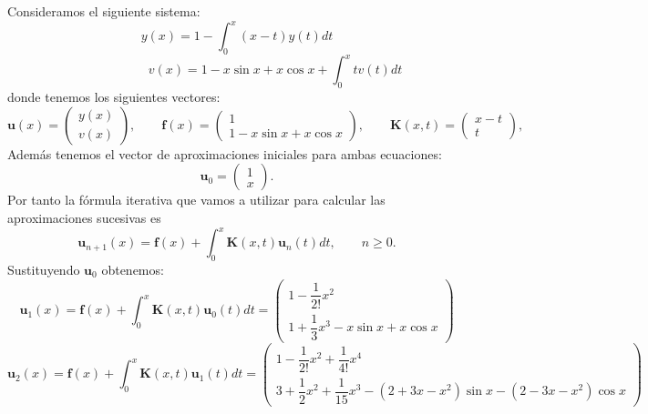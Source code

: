 \begin{ejemplo}
	Consideramos el siguiente sistema:
	\begin{equation}
		y(x) = 1 - \int_0^x (x-t)y(t)dt
	\end{equation}
	\begin{equation}
		\qquad \qquad \qquad v(x) = 1 - x \sin x + x \cos x + \int_0^x tv(t)dt
	\end{equation}
	donde tenemos los siguientes vectores:
	\begin{equation}
		\textbf{u}(x) = \begin{pmatrix}	y(x) \\ v(x)	\end{pmatrix}, \qquad \textbf{f}(x) = \begin{pmatrix}	1 \\ 1 - x \sin x + x \cos x	\end{pmatrix}, \qquad \textbf{K}(x,t) = \begin{pmatrix}	x-t \\ t	\end{pmatrix},
	\end{equation}
	Además tenemos el vector de aproximaciones iniciales para ambas ecuaciones:
	\begin{equation}
		\textbf{u}_0 = \begin{pmatrix}	1 \\ x	\end{pmatrix}.
	\end{equation}
	Por tanto la fórmula iterativa que vamos a utilizar para calcular las aproximaciones sucesivas es
	\begin{equation}
		\textbf{u}_{n+1}(x) = \textbf{f}(x) + \int_0^x \textbf{K}(x,t)\textbf{u}_n(t)dt, \qquad n \geqslant 0.
	\end{equation}
	Sustituyendo $\textbf{u}_0$ obtenemos:
	\begin{equation}
		\textbf{u}_{1}(x) = \textbf{f}(x) + \int_0^x \textbf{K}(x,t)\textbf{u}_0(t)dt = \begin{pmatrix}	1 - \dfrac{1}{2!}x^2 \\ 1 + \dfrac{1}{3}x^3 - x \sin x + x \cos x	\end{pmatrix}
	\end{equation}
		\begin{equation}
		\textbf{u}_{2}(x) = \textbf{f}(x) + \int_0^x \textbf{K}(x,t)\textbf{u}_1(t)dt = \begin{pmatrix}	1 - \dfrac{1}{2!}x^2 + \dfrac{1}{4!}x^4 \\ 3 + \dfrac{1}{2}x^2 + \dfrac{1}{15}x^3 - (2+3x-x^2) \sin x - (2-3x-x^2)\cos x	\end{pmatrix}

\end{equation}
\end{ejemplo}
